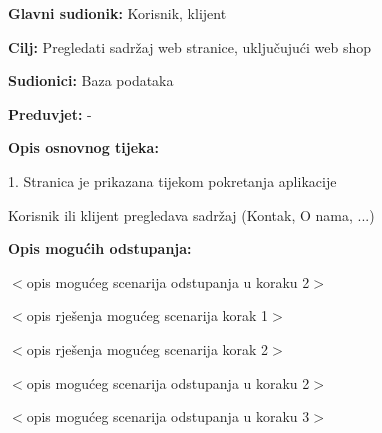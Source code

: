 				
					

					\noindent {}
					\begin{packed_item}
	
						\item \textbf{Glavni sudionik: } Korisnik, klijent
						\item  \textbf{Cilj:} Pregledati sadržaj web stranice, uključujući web shop
						\item  \textbf{Sudionici:} Baza podataka
						\item  \textbf{Preduvjet:} -
						\item  \textbf{Opis osnovnog tijeka:}
						
						\item[] \begin{packed_enum}
	
							\item 1. Stranica je prikazana tijekom pokretanja aplikacije
							\item Korisnik ili klijent pregledava sadržaj (Kontak, O nama, ...)
						\end{packed_enum}
						
						\item  \textbf{Opis mogućih odstupanja:}
						
						\item[] \begin{packed_item}
	
							\item[2.a] $<$opis mogućeg scenarija odstupanja u koraku 2$>$
							\item[] \begin{packed_enum}
								
								\item $<$opis rješenja mogućeg scenarija korak 1$>$
								\item $<$opis rješenja mogućeg scenarija korak 2$>$
								
							\end{packed_enum}
							\item[2.b] $<$opis mogućeg scenarija odstupanja u koraku 2$>$
							\item[3.a] $<$opis mogućeg scenarija odstupanja  u koraku 3$>$
							
						\end{packed_item}
						\end{packed_item}
					
					
					
				
				

